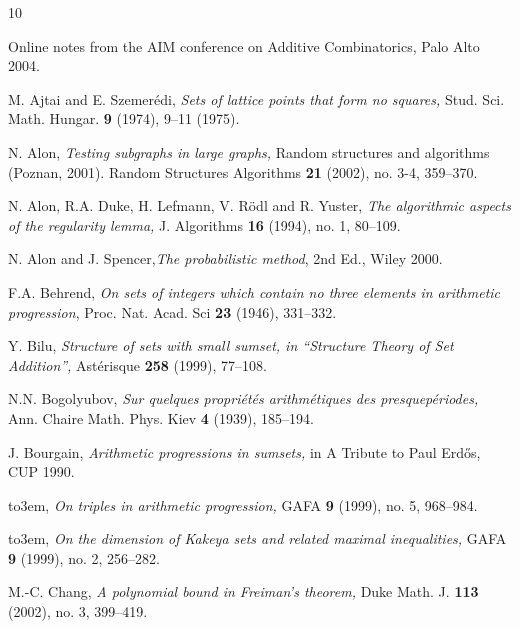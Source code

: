 \documentclass[12pt,a4paper,reqno]{amsart}
\numberwithin{equation}{section}
\theoremstyle{plain}
\theoremstyle{definition}
\begin{document}
\providecommand{\bysame}{\leavevmode\hbox to3em{\hrulefill}\thinspace}
\providecommand{\MR}{\relax\ifhmode\unskip\space\fi MR }
\providecommand{\MRhref}[2]{%
  \href{http://www.ams.org/mathscinet-getitem?mr=#1}{#2}
}
\providecommand{\href}[2]{#2}
\begin{thebibliography}{10}

 Online notes from the AIM conference on Additive Combinatorics, Palo Alto 2004.

 M. Ajtai and E. Szemer\'edi, \emph{Sets of lattice points that form no squares,} Stud. Sci. Math. Hungar. \textbf{9} (1974), 9--11 (1975).

 N. Alon,
\emph{Testing subgraphs in large graphs,} 
Random structures and algorithms (Poznan, 2001). 
Random Structures Algorithms \textbf{21} (2002), no. 3-4, 359--370.

 N. Alon, R.A. Duke, H. Lefmann, V. R\"odl and R. Yuster, \emph{
The algorithmic aspects of the regularity lemma,} 
J. Algorithms \textbf{16} (1994), no. 1, 80--109.


 N. Alon and J. Spencer,\emph{The probabilistic method}, 2nd Ed., Wiley 2000.

 F.A. Behrend,  \emph{On sets of integers which contain no three elements in arithmetic progression}, Proc. Nat. Acad. Sci \textbf{23} (1946), 331--332.

 Y. Bilu, \emph{Structure of sets with small sumset, in ``Structure Theory of Set Addition'',} Ast\'erisque \textbf{258} (1999), 77--108. 

 N.N. Bogolyubov, \emph{Sur quelques propri\'et\'es arithm\'etiques des presquep\'eriodes,} Ann. Chaire Math. Phys. Kiev \textbf{4} (1939), 185--194.

 J. Bourgain, \emph{Arithmetic progressions in sumsets,} in A Tribute to Paul Erd\H{o}s, CUP 1990.

 \bysame, \emph{On triples in arithmetic progression,} GAFA \textbf{9} (1999), no. 5, 968--984.

 \bysame, \emph{On the dimension of Kakeya sets and related maximal inequalities,} GAFA \textbf{9} (1999), no. 2, 256--282.


 M.-C. Chang, \emph{A polynomial bound in Freiman's theorem,} Duke Math. J. \textbf{113} (2002), no. 3, 399--419.


\end{thebibliography}
\end{document}
